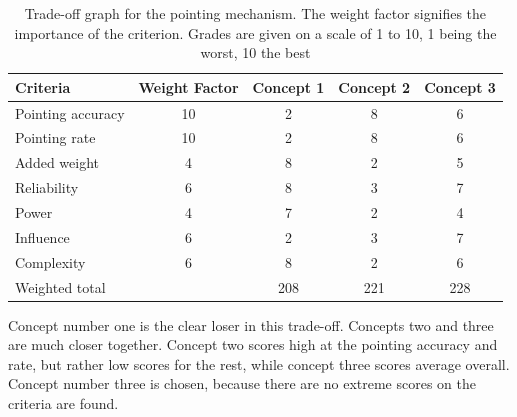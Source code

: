 \begin{table} [h]
\centering
\begin{tabular}{p{3cm} | c | c c c}
\textbf{Criteria} & \textbf{Weight Factor} & \textbf{Concept 1} & \textbf{Concept 2} & \textbf{Concept 3} \\ \hline \hline
Pointing accuracy & 10 & 2 & 8 & 6 \\
Pointing rate     & 10 & 2 & 8 & 6 \\
Added weight      & 4  & 8 & 2 & 5 \\
Reliability       & 6  & 8 & 3 & 7 \\
Power             & 4  & 7 & 2 & 4 \\
Influence         & 6  & 2 & 3 & 7\\
Complexity        & 6  & 8 & 2 & 6 \\ \hline
Weighted total    &    & 208 & 221 & 228
\end{tabular} 
\caption[Trade-off pointing mechanism]{Trade-off graph for the pointing mechanism. The weight factor signifies the importance of the criterion. Grades are given on a scale of 1 to 10, 1 being the worst, 10 the best}
\label{tab:pointingtradeoff}
\end{table}

Concept number one is the clear loser in this trade-off. Concepts two and three are much closer together. Concept two scores high at the pointing accuracy and rate, but rather low scores for the rest, while concept three scores average overall. 
Concept number three is chosen, because there are no extreme scores on the criteria are found.